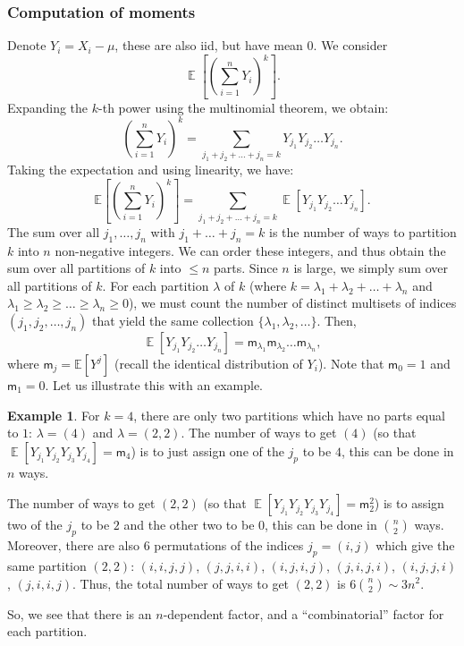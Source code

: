 \documentclass[letterpaper,11pt,oneside,reqno]{book}
\numberwithin{equation}{chapter}  %
\theoremstyle{definition}
\newtheorem{example}[proposition]{Example}
\begin{document}
\subsubsection{Computation of moments}

Denote $Y_i=X_i-\mu$, these are also iid, but have mean $0$.
We consider
\begin{equation*}
	\operatorname{\mathbb{E}}\left[ \left( \sum_{i=1}^n Y_i \right)^k \right].
\end{equation*}
Expanding the $k$-th power using the multinomial theorem, we obtain:
\begin{equation*}
\left( \sum_{i=1}^n Y_i \right)^k = \sum_{j_1 + j_2 + \dots + j_n = k}
Y_{j_1} Y_{j_2} \dots Y_{j_n}.
\end{equation*}
Taking the expectation and using linearity, we have:
\begin{equation*}
 \mathbb{E}\left[ \left( \sum_{i=1}^n Y_i \right)^k \right]
 =
 \sum_{j_1 + j_2 + \dots + j_n = k}
 \operatorname{\mathbb{E}}\left[
	 Y_{j_1} Y_{j_2} \dots Y_{j_n}
 \right].
\end{equation*}
The sum over all $j_1, \ldots, j_n$ with $j_1 + \ldots + j_n = k$ is the number of ways to partition $k$ into $n$ non-negative integers.
We can order these integers, and thus
obtain the sum over all partitions of $k$ into $\le n$ parts.
Since $n$ is large, we simply sum over all partitions of $k$.
For each partition $\lambda$ of $k$
(where $k=\lambda_1+\lambda_2+\ldots+\lambda_n $ and
$\lambda_1\geq \lambda_2\geq \ldots\geq \lambda_n\geq 0$),
we must count the number of distinct multisets of indices
\((j_1,j_2,\ldots,j_n)\) that yield the same collection
\(\{\lambda_1,\lambda_2,\ldots\}\).
Then,
\begin{equation*}
	\operatorname{\mathbb{E}}\left[
		Y_{j_1} Y_{j_2} \dots Y_{j_n}
	\right]=
	\mathsf{m}_{\lambda_1}\mathsf{m}_{\lambda_2}\ldots \mathsf{m}_{\lambda_n},
\end{equation*}
where $\mathsf{m}_j=\mathbb{E}[Y^j]$ (recall the identical distribution of $Y_i$).
Note that
$\mathsf{m}_0 = 1$ and
$\mathsf{m}_1 = 0$.
Let us illustrate this with an
example.

\begin{example}
	For $k=4$, there are only two partitions
	which have no parts equal to $1$:
	$\lambda=(4)$ and $\lambda=(2,2)$.
	The number of ways to get $(4)$
	(so that
	$\operatorname{\mathbb{E}}[Y_{j_1} Y_{j_2} Y_{j_3} Y_{j_4}] = \mathsf{m}_4$)
	is to just
	assign one of the $j_p$ to be $4$,
	this can be done in $n$ ways.

	The number of ways to get $(2,2)$
	(so that
	$\operatorname{\mathbb{E}}[Y_{j_1} Y_{j_2} Y_{j_3} Y_{j_4}] = \mathsf{m}_2^2$)
	is to assign
	two of the $j_p$ to be $2$ and the other two to be $0$, this can be done in $\binom{n}{2}$ ways. Moreover,
	there are also 6 permutations of the indices
	$j_p=(i,j)$ which give the same partition $(2,2)$:
	$(i,i,j,j)$, $(j,j,i,i)$, $(i,j,i,j)$, $(j,i,j,i)$, $(i,j,j,i)$, $(j,i,i,j)$.
	Thus, the total number of ways to get $(2,2)$ is $6\binom{n}{2}\sim 3n^2$.

	So, we see that there is an $n$-dependent factor,
	and a ``combinatorial'' factor for each partition.
\end{example}
\end{document}

